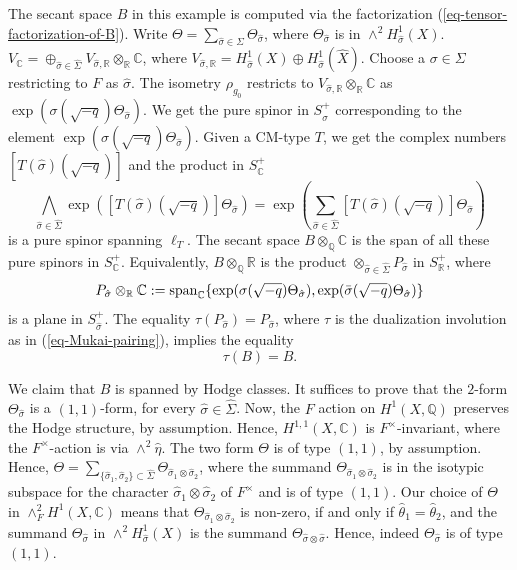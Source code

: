 \documentclass[12pt]{amsart}
\numberwithin{equation}{subsection}
\theoremstyle{plain}
\theoremstyle{definition}
\newcommand{\CC}{{\mathbb C}}
\newcommand{\QQ}{{\mathbb Q}}
\newcommand{\RR}{{\mathbb R}}
\renewcommand{\span}{{\rm span}}
\begin{document}
{The secant space $B$ in this example is computed via the factorization (\ref{eq-tensor-factorization-of-B}). Write 
$\Theta=\sum_{\hat{\sigma}\in\hat{\Sigma}}\Theta_{\hat{\sigma}}$, where $\Theta_{\hat{\sigma}}$ is in
$\wedge^2H^1_{\hat{\sigma}}(X)$. 
$V_\CC=\oplus_{\hat{\sigma}\in\hat{\Sigma}}V_{\hat{\sigma},\RR}\otimes_\RR\CC$, where
$V_{\hat{\sigma},\RR}=H^1_{\hat{\sigma}}(X)\oplus H^1_{\hat{\sigma}}(\hat{X})$. Choose a $\sigma\in\Sigma$ restricting to $F$ as $\hat{\sigma}$. 
The isometry $\rho_{g_0}$ restricts to $V_{\hat{\sigma},\RR}\otimes_\RR\CC$ as $\exp(\sigma(\sqrt{-q})\Theta_{\hat{\sigma}})$. We get the pure spinor in
$S^+_{\hat{\sigma}}$ corresponding to the element $\exp(\sigma(\sqrt{-q})\Theta_{\hat{\sigma}})$. Given a CM-type $T$, we get the complex numbers
$[T(\hat{\sigma})(\sqrt{-q})]$ and 
the product in $S^+_\CC$
\begin{equation}
\label{eq-set-of-pure-spinnors-spanning-B}
\bigwedge_{\hat{\sigma}\in \hat{\Sigma}}\exp\left([T(\hat{\sigma})(\sqrt{-q})]\Theta_{\hat{\sigma}}\right)=
\exp\left(\sum_{\hat{\sigma}\in \hat{\Sigma}}[T(\hat{\sigma})(\sqrt{-q})]\Theta_{\hat{\sigma}}
\right)
\end{equation}
is a pure spinor spanning $\ell_T$. The secant space $B\otimes_\QQ\CC$ is the span of all these pure spinors in $S^+_\CC$. Equivalently, $B\otimes_\QQ\RR$ is the product $\otimes_{\hat{\sigma}\in\hat{\Sigma}}P_{\hat{\sigma}}$ in $S^+_\RR$, where 
\[
P_{\hat{\sigma}}\otimes_\RR\CC:=\span_\CC\{\exp(\sigma(\sqrt{-q})\Theta_{\hat{\sigma}}), \exp(\bar{\sigma}(\sqrt{-q})\Theta_{\hat{\sigma}})\}
\]
is a plane in $S^+_{\hat{\sigma}}$. The equality $\tau(P_{\hat{\sigma}})=P_{\hat{\sigma}}$, where $\tau$ is the dualization involution  as in (\ref{eq-Mukai-pairing}), implies the equality
\[
\tau(B)=B.
\]

We claim that $B$ is spanned by Hodge classes. It suffices to prove that 
the $2$-form $\Theta_{\hat{\sigma}}$ is a $(1,1)$-form, for every $\hat{\sigma}\in\hat{\Sigma}$. Now, the $F$ action on $H^1(X,\QQ)$ preserves the Hodge structure, by assumption.
Hence, $H^{1,1}(X,\CC)$ is $F^\times$-invariant, where the $F^\times$-action is via $\wedge^2\hat{\eta}$. The two form $\Theta$ is of type $(1,1)$, by assumption. Hence, $\Theta=\sum_{\{\hat{\sigma}_1,\hat{\sigma}_2\}\subset\hat{\Sigma}}\Theta_{\hat{\sigma}_1\otimes\hat{\sigma}_2}$, where 
the summand $\Theta_{\hat{\sigma}_1\otimes\hat{\sigma}_2}$ is in the isotypic subspace for the character $\hat{\sigma}_1\otimes\hat{\sigma}_2$
of $F^\times$ and is of type $(1,1)$. Our choice of $\Theta$ in $\wedge^2_FH^1(X,\CC)$ means that $\Theta_{\hat{\sigma}_1\otimes\hat{\sigma}_2}$ is non-zero, if and only if $\hat{\theta}_1=\hat{\theta}_2$, and the summand $\Theta_{\hat{\sigma}}$ in $\wedge^2H^1_{\hat{\sigma}}(X)$ is the summand 
$\Theta_{\hat{\sigma}\otimes\hat{\sigma}}$. Hence, indeed $\Theta_{\hat{\sigma}}$ is of type $(1,1)$.


}
\end{document}
